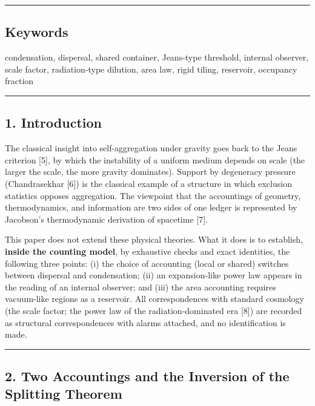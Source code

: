 \documentclass[
]{ltjsarticle}
\begin{document}
\begin{center}\rule{0.5\linewidth}{0.5pt}\end{center}

\subsection{Keywords}\label{keywords}

condensation, dispersal, shared container, Jeans-type threshold,
internal observer, scale factor, radiation-type dilution, area law,
rigid tiling, reservoir, occupancy fraction

\begin{center}\rule{0.5\linewidth}{0.5pt}\end{center}

\subsection{1. Introduction}\label{introduction}

The classical insight into self-aggregation under gravity goes back to
the Jeans criterion {[}5{]}, by which the instability of a uniform
medium depends on scale (the larger the scale, the more gravity
dominates). Support by degeneracy pressure (Chandrasekhar {[}6{]}) is
the classical example of a structure in which exclusion statistics
opposes aggregation. The viewpoint that the accountings of geometry,
thermodynamics, and information are two sides of one ledger is
represented by Jacobson's thermodynamic derivation of spacetime {[}7{]}.

This paper does not extend these physical theories. What it does is to
establish, \textbf{inside the counting model}, by exhaustive checks and
exact identities, the following three points: (i) the choice of
accounting (local or shared) switches between dispersal and
condensation; (ii) an expansion-like power law appears in the reading of
an internal observer; and (iii) the area accounting requires vacuum-like
regions as a reservoir. All correspondences with standard cosmology (the
scale factor; the power law of the radiation-dominated era {[}8{]}) are
recorded as structural correspondences with alarms attached, and no
identification is made.

\begin{center}\rule{0.5\linewidth}{0.5pt}\end{center}

\subsection{2. Two Accountings and the Inversion of the Splitting
Theorem}\label{two-accountings-and-the-inversion-of-the-splitting-theorem}
\end{document}

